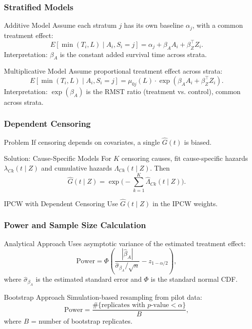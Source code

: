 \documentclass{beamer}
\begin{document}
\begin{frame}
\frametitle{Stratified Models \citep{royston2011}}

\begin{block}{Additive Model}
Assume each stratum $j$ has its own baseline $\alpha_j$, with a common treatment effect:
\[
E[\min(T_i,L) \mid A_i, S_i=j] = \alpha_j + \beta_A A_i + \beta_Z^\top Z_i.
\]
Interpretation: $\beta_A$ is the constant added survival time across strata.
\end{block}

\begin{block}{Multiplicative Model}
Assume proportional treatment effect across strata:
\[
E[\min(T_i,L) \mid A_i, S_i=j] = \mu_{0j}(L) \cdot \exp(\beta_A A_i + \beta_Z^\top Z_i).
\]
Interpretation: $\exp(\beta_A)$ is the RMST ratio (treatment vs. control), common across strata.
\end{block}

\end{frame}

\begin{frame}
\frametitle{Dependent Censoring \citep{robins2000}}

\begin{block}{Problem}
If censoring depends on covariates, a single $\widehat{G}(t)$ is biased.
\end{block}

\begin{block}{Solution: Cause-Specific Models}
For $K$ censoring causes, fit cause-specific hazards $\lambda_{Ck}(t \mid Z)$ and cumulative hazards $\Lambda_{Ck}(t \mid Z)$.  
Then
\[
\widehat{G}(t \mid Z) = \exp\!\Big(-\sum_{k=1}^K \widehat{\Lambda}_{Ck}(t \mid Z)\Big).
\]
\end{block}

\begin{block}{IPCW with Dependent Censoring}
Use $\widehat{G}(t \mid Z)$ in the IPCW weights.
\end{block}

\end{frame}

\begin{frame}
\frametitle{Power and Sample Size Calculation}

\begin{block}{Analytical Approach}
Uses asymptotic variance of the estimated treatment effect:
\[
\text{Power} = 
\Phi\!\left( 
\frac{|\widehat{\beta}_A|}{\widehat{\sigma}_{\beta_A}/\sqrt{n}} - z_{1-\alpha/2}
\right),
\]
where $\widehat{\sigma}_{\beta_A}$ is the estimated standard error and $\Phi$ is the standard normal CDF.
\end{block}

\begin{block}{Bootstrap Approach}
Simulation-based resampling from pilot data:
\[
\text{Power} =
\frac{\#\{\text{replicates with $p$-value} < \alpha\}}{B},
\]
where $B$ = number of bootstrap replicates.
\end{block}

\end{frame}
\end{document}
